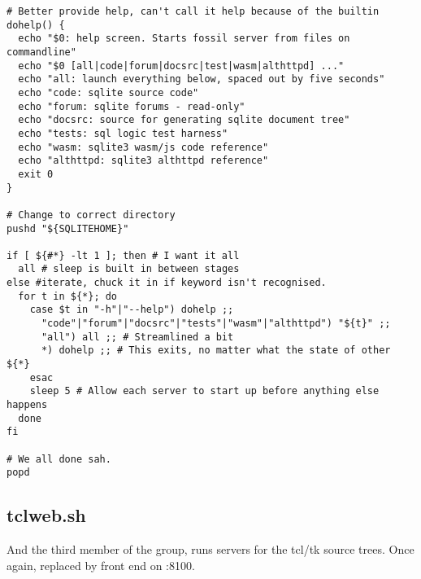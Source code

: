 \documentclass[11pt]{article}
\begin{document}
\begin{verbatim}
# Better provide help, can't call it help because of the builtin
dohelp() {
  echo "$0: help screen. Starts fossil server from files on commandline"
  echo "$0 [all|code|forum|docsrc|test|wasm|althttpd] ..."
  echo "all: launch everything below, spaced out by five seconds"
  echo "code: sqlite source code"
  echo "forum: sqlite forums - read-only"
  echo "docsrc: source for generating sqlite document tree"
  echo "tests: sql logic test harness"
  echo "wasm: sqlite3 wasm/js code reference"
  echo "althttpd: sqlite3 althttpd reference"
  exit 0
}

# Change to correct directory
pushd "${SQLITEHOME}"

if [ ${#*} -lt 1 ]; then # I want it all
  all # sleep is built in between stages
else #iterate, chuck it in if keyword isn't recognised.
  for t in ${*}; do
    case $t in "-h"|"--help") dohelp ;;
      "code"|"forum"|"docsrc"|"tests"|"wasm"|"althttpd") "${t}" ;;
      "all") all ;; # Streamlined a bit
      *) dohelp ;; # This exits, no matter what the state of other ${*}
    esac
    sleep 5 # Allow each server to start up before anything else happens
  done
fi

# We all done sah.
popd

\end{verbatim}

\subsection*{tclweb.sh}
\label{sec:org86d33dc}
And the third member of the group, runs servers for the tcl/tk source trees. Once again, replaced
by front end on :8100.
\end{document}
